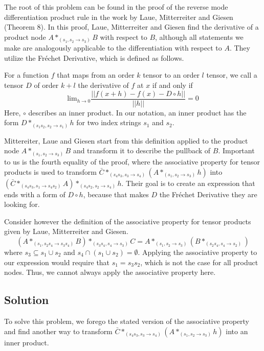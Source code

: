 \documentclass[12pt, a4paper]{report}
\begin{document}
The root of this problem can be found in the proof of the reverse mode differentiation product rule in the work \cite{tensorpaper} by Laue, Mitterreiter and Giesen (Theorem 8).
In this proof, Laue, Mitterreiter and Giesen find the derivative of a product node $A *_{(s_1, s_2 \rightarrow s_3)} B$ with respect to $B$, although all statements we make are analogously applicable to the differentiation with respect to $A$.
They utilize the Fr\'{e}chet Derivative, which is defined as follows.

For a function $f$ that maps from an order $k$ tensor to an order $l$ tensor, we call a tensor $D$ of order $k+l$ the derivative of $f$ at $x$ if and only if
$$
\text{lim}_{h \rightarrow 0} \frac{||f(x+h) - f(x) - D \circ h||}{||h||} = 0
$$
Here, $\circ$ describes an inner product.
In our notation, an inner product has the form $D *_{(s_1 s_2, s_2 \rightarrow s_1)} h$ for two index strings $s_1$ and $s_2$.

Mittereiter, Laue and Giesen start from this definition applied to the product node $A *_{(s_1, s_2 \rightarrow s_3)} B$ and transform it to describe the pullback of $B$.
Important to us is the fourth equality of the proof, where the associative property for tensor products is used to transform $\bar{C} *_{(s_4s_3,s_3 \rightarrow s_4)} (A *_{(s_1,s_2 \rightarrow s_3)} h)$ into $(\bar{C} *_{(s_4s_3,s_1 \rightarrow s_4s_2)} A) *_{(s_4s_2,s_2 \rightarrow s_4)} h$.
Their goal is to create an expression that ends with a form of $D \circ h$, because that makes $D$ the Fr\'{e}chet Derivative they are looking for.

Consider however the definition of the associative property for tensor products given by Laue, Mitterreiter and Giesen.
$$
(A *_{(s_1, s_2 s_4 \rightarrow s_3 s_4)} B) *_{(s_3 s_4, s_4 \rightarrow s_3)} C = A *_{(s_1, s_2 \rightarrow s_3)} (B *_{(s_2 s_4, s_4 \rightarrow s_2)})
$$
where $s_3 \subseteq s_1 \cup s_2$ and $s_4 \cap (s_1 \cup s_2) = \emptyset$. 
Applying the associative property to our expression would require that $s_1 = s_3 s_2$, which is not the case for all product nodes.
Thus, we cannot always apply the associative property here.

\subsection{Solution}
To solve this problem, we forego the stated version of the associative property and find another way to transform $\bar{C} *_{(s_4s_3,s_3 \rightarrow s_4)} (A *_{(s_1,s_2 \rightarrow s_3)} h)$ into an inner product.
\end{document}
